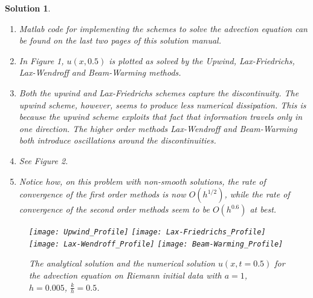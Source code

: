 \documentclass[10pt,letterpaper]{article}
\newcommand{\frb}[1]{ \left(  {#1} \right) }
\theoremstyle{break}
\newtheorem{solution}{Solution}
\begin{document}
\begin{solution}
	\begin{enumerate}
		\item
		Matlab code for implementing the schemes to solve the advection equation can be found on the last two pages of this solution manual.
		
		\item
		In Figure 1, $u\frb{x,0.5}$ is plotted as solved by the Upwind, Lax-Friedrichs, Lax-Wendroff and Beam-Warming methods.
		
		\item
		Both the upwind and Lax-Friedrichs schemes capture the discontinuity.
		The upwind scheme, however, seems to produce less numerical dissipation.
		This is because the upwind scheme exploits that fact that information travels only in one direction.
		The higher order methods Lax-Wendroff and Beam-Warming both introduce oscillations around the discontinuities.
		
		\item[(d),(e)]
		\addtocounter{enumii}{2}
		See Figure 2.
		
		
		\item
		Notice how, on this problem with non-smooth solutions, the rate of convergence of the first order methods is now $O\frb{h^{1/2}}$, while the rate of convergence of the second order methods seem to be $O\frb{h^{0.6}}$ at best.
    \end{enumerate}
		
		
		
		
		
    \newpage
    \begin{figure}[H] 
    \begin{center}
    {\texttt{[image: Upwind\_Profile]}}
    {\texttt{[image: Lax-Friedrichs\_Profile]}}
    {\texttt{[image: Lax-Wendroff\_Profile]}}
    {\texttt{[image: Beam-Warming\_Profile]}}
    \caption{ The analytical solution and the numerical solution $u(x,t=0.5)$ for the advection equation on Riemann initial data with $a=1$, $h=0.005$, $\frac{k}{h}=0.5$.} 
    \end{center}
    \end{figure}
    

\end{solution}
\end{document}
